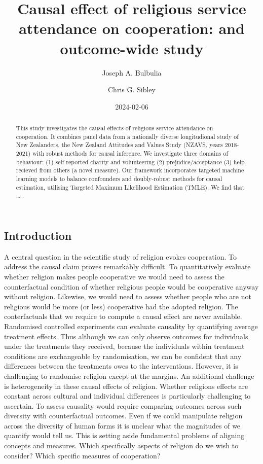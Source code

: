 \documentclass[
  singlecolumn]{article}
\title{Causal effect of religious service attendance on cooperation: and
outcome-wide study}
\author{Joseph A. Bulbulia \and Chris G. Sibley}
\date{2024-02-06}
\begin{document}
\maketitle
\begin{abstract}
This study investigates the causal effects of religious service
attendance on cooperation. It combines panel data from a nationally
diverse longitudional study of New Zealanders, the New Zealand Attitudes
and Values Study (NZAVS, years 2018-2021) with robust methods for causal
inference. We investigate three domains of behaviour: (1) self reported
charity and volunteering (2) prejudice/acceptance (3) help-recieved from
others (a novel measure). Our framework incorporates targeted machine
learning models to balance confounders and doubly-robust methods for
causal estimation, utilising Targeted Maximum Likelihood Estimation
(TMLE). We find that \ldots{} .
\end{abstract}

\subsection{Introduction}\label{introduction}

A central question in the scientific study of religion evokes
cooperation. To address the causal claim proves remarkably difficult. To
quantitatively evaluate whether religion makes people cooperative we
would need to assess the counterfactual condition of whether religious
people would be cooperative anyway without religion. Likewise, we would
need to assess whether people who are not religious would be more (or
less) cooperative had the adopted religion. The conterfactuals that we
require to compute a causal effect are never available. Randomised
controlled experiments can evaluate causality by quantifying average
treatment effects. Thus although we can only observe outcomes for
individuals under the treatments they received, because the individuals
within treatment conditions are exchangeable by randomisation, we can be
confident that any differences between the treatments owes to the
interventions. However, it is challenging to randomise religion except
at the margins. An additional challenge is heterogeneity in these causal
effects of religion. Whether religions effects are constant across
cultural and individual differences is particularly challenging to
ascertain. To assess causality would require comparing outcomes across
such diversity with counterfactual outcomes. Even if we could manipulate
religion across the diversity of human forms it is unclear what the
magnitudes of we quantify would tell us. This is setting aside
fundamental problems of aligning concepts and measures. Which
specifically aspects of religion do we wish to consider? Which specific
measures of cooperation?
\end{document}
